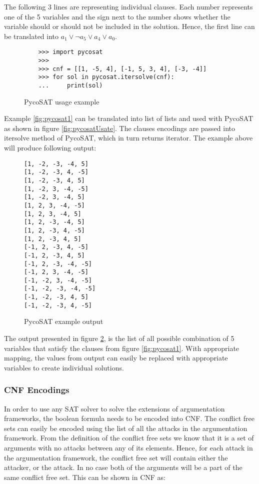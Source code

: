The following 3 lines are representing individual clauses. Each number represents one of the 5 variables and the sign next to the number shows whether the variable should or should not be included in the solution. Hence, the first line can be translated into $ a_1 \lor \neg a_5 \lor a_4 \lor a_0 $. 

\begin{figure}
\begin{verbatim}
	>>> import pycosat
	>>>
	>>> cnf = [[1, -5, 4], [-1, 5, 3, 4], [-3, -4]]
	>>> for sol in pycosat.itersolve(cnf):
	...	    print(sol)
\end{verbatim}
\caption{PycoSAT usage example}
\label{fig:pycosatUsage}
\end{figure}

Example \ref{fig:pycosat1} can be translated into list of lists and used with PycoSAT as shown in figure \ref{fig:pycosatUsate}. The clauses encodings are passed into itersolve method of PycoSAT, which in turn returns iterator. The example above will produce following output:

\begin{figure}
	\begin{verbatim}
[1, -2, -3, -4, 5]
[1, -2, -3, 4, -5]
[1, -2, -3, 4, 5]
[1, -2, 3, -4, -5]
[1, -2, 3, -4, 5]
[1, 2, 3, -4, -5]
[1, 2, 3, -4, 5]
[1, 2, -3, -4, 5]
[1, 2, -3, 4, -5]
[1, 2, -3, 4, 5]
[-1, 2, -3, 4, -5]
[-1, 2, -3, 4, 5]
[-1, 2, -3, -4, -5]
[-1, 2, 3, -4, -5]
[-1, -2, 3, -4, -5]
[-1, -2, -3, -4, -5]
[-1, -2, -3, 4, 5]
[-1, -2, -3, 4, -5]
	\end{verbatim}
	\caption{PycoSAT example output}
	\label{fig:pycosatOutput}
\end{figure}

The output presented in figure \ref{fig:pycosatOutput}, is the list of all possible combination of 5 variables that satisfy the clauses from figure \ref{fig:pycosat1}. With appropriate mapping, the values from output can easily be replaced with appropriate variables to create individual solutions. 



\subsubsection{CNF Encodings}
In order to use any SAT solver to solve the extensions of argumentation frameworks, the boolean formula needs to be encoded into CNF. The conflict free sets can easily be encoded using the list of all the attacks in the argumentation framework. From the definition of the conflict free sets we know that it is a set of arguments with no attacks between any of its elements. Hence, for each attack in the argumentation framework, the conflict free set will contain either the attacker, or the attack. In no case both of the arguments will be a part of the same conflict free set. This can be shown in CNF as:

